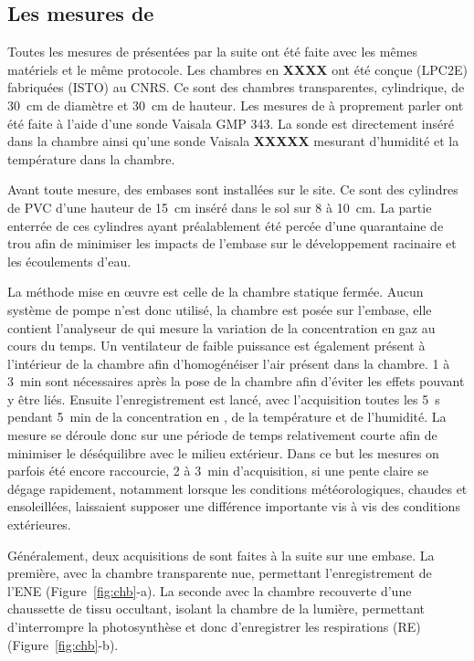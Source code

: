 \subsection{Les mesures de \coo}

Toutes les mesures de \coo présentées par la suite ont été faite avec les mêmes matériels et le même protocole.
Les chambres en \textbf{XXXX} ont été conçue (LPC2E) fabriquées (ISTO) au CNRS.
Ce sont des chambres transparentes, cylindrique, de \SI{30}{\centi\metre} de diamètre et \SI{30}{\centi\metre} de hauteur.
Les mesures de \coo à proprement parler ont été faite à l'aide d'une sonde Vaisala GMP 343\textregistered.
La sonde est directement inséré dans la chambre ainsi qu'une sonde Vaisala \textbf{XXXXX} mesurant d'humidité et la température dans la chambre.

Avant toute mesure, des embases sont installées sur le site.
Ce sont des cylindres de PVC d'une hauteur de \SI{15}{\centi\metre} inséré dans le sol sur 8 à \SI{10}{\centi\metre}.
La partie enterrée de ces cylindres ayant préalablement été percée d'une quarantaine de trou afin de minimiser les impacts de l'embase sur le développement racinaire et les écoulements d'eau.

La méthode mise en œuvre est celle de la chambre statique fermée.
Aucun système de pompe n'est donc utilisé, la chambre est posée sur l'embase, elle contient l'analyseur de \coo qui mesure la variation de la concentration en gaz au cours du temps.
Un ventilateur de faible puissance est également présent à l'intérieur de la chambre afin d'homogénéiser l'air présent dans la chambre.
1 à \SI{3}{\minute} sont nécessaires après la pose de la chambre afin d'éviter les effets pouvant y être liés.
Ensuite l’enregistrement est lancé, avec l'acquisition toutes les \SI{5}{\second} pendant \SI{5}{\minute} de la concentration en \coo, de la température et de l'humidité.
La mesure se déroule donc sur une période de temps relativement courte afin de minimiser le déséquilibre avec le milieu extérieur.
Dans ce but les mesures on parfois été encore raccourcie, 2 à \SI{3}{\minute} d'acquisition, si une pente claire se dégage rapidement, notamment lorsque les conditions météorologiques, chaudes et ensoleillées, laissaient supposer une différence importante vis à vis des conditions extérieures.

Généralement, deux acquisitions de \coo sont faites à la suite sur une embase.
La première, avec la chambre transparente nue, permettant l'enregistrement de l'ENE (Figure~\ref{fig:chb}-a).
La seconde avec la chambre recouverte d'une chaussette de tissu occultant, isolant la chambre de la lumière, permettant d'interrompre la photosynthèse et donc d'enregistrer les respirations (RE) (Figure~\ref{fig:chb}-b).

